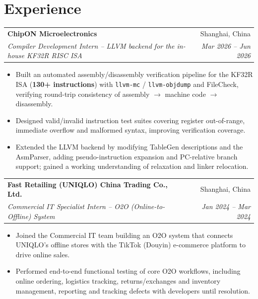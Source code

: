 \documentclass[11pt]{article}
\makeatletter
\newcommand{\entry}[4]{%
  \begin{tabularx}{\linewidth}{@{}X r@{}}
    \textbf{#1} & #2 \\
    \textit{#3} & \textit{#4} \\
  \end{tabularx}\vspace{-2pt}%
}
\makeatother
\begin{document}
\section{Experience}
\entry{ChipON Microelectronics}{Shanghai, China}
      {Compiler Development Intern -- LLVM backend for the in-house KF32R RISC ISA}{Mar 2026 -- Jun 2026}
\begin{itemize}
  \item Built an automated assembly/disassembly verification pipeline for the KF32R ISA (\textbf{130+ instructions}) with \texttt{llvm-mc} / \texttt{llvm-objdump} and FileCheck, verifying round-trip consistency of assembly $\rightarrow$ machine code $\rightarrow$ disassembly.
  \item Designed valid/invalid instruction test suites covering register out-of-range, immediate overflow and malformed syntax, improving verification coverage.
  \item Extended the LLVM backend by modifying TableGen descriptions and the AsmParser, adding pseudo-instruction expansion and PC-relative branch support; gained a working understanding of relaxation and linker relocation.
\end{itemize}
\vspace{2pt}
\entry{Fast Retailing (UNIQLO) China Trading Co., Ltd.}{Shanghai, China}
      {Commercial IT Specialist Intern -- O2O (Online-to-Offline) System}{Jan 2024 -- Mar 2024}
\begin{itemize}
  \item Joined the Commercial IT team building an O2O system that connects UNIQLO's offline stores with the TikTok (Douyin) e-commerce platform to drive online sales.
  \item Performed end-to-end functional testing of core O2O workflows, including online ordering, logistics tracking, returns/exchanges and inventory management, reporting and tracking defects with developers until resolution.
\end{itemize}

\end{document}
